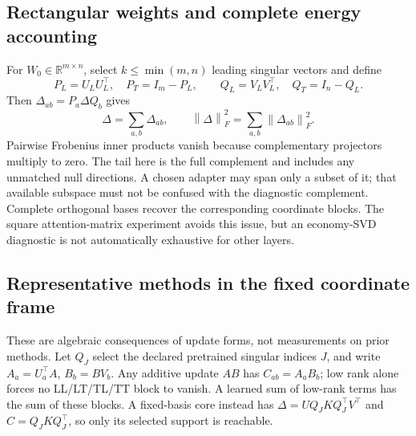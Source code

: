 \documentclass{article}
\newcommand{\fro}[1]{\left\|#1\right\|_F}
\begin{document}
\subsection{Rectangular weights and complete energy accounting}
\label{app:rectangular}
For $W_0\in\mathbb R^{m\times n}$, select $k\le\min(m,n)$ leading singular vectors and define
\begin{equation}
P_L=U_LU_L^\top,\quad P_T=I_m-P_L,\qquad
Q_L=V_LV_L^\top,\quad Q_T=I_n-Q_L.
\end{equation}
Then $\Delta_{ab}=P_a\Delta Q_b$ gives
\begin{equation}
\Delta=\sum_{a,b}\Delta_{ab},\qquad
\fro{\Delta}^2=\sum_{a,b}\fro{\Delta_{ab}}^2.
\end{equation}
Pairwise Frobenius inner products vanish because complementary projectors multiply to zero. The tail here is the full complement and includes any unmatched null directions. A chosen adapter may span only a subset of it; that available subspace must not be confused with the diagnostic complement. Complete orthogonal bases recover the corresponding coordinate blocks. The square attention-matrix experiment avoids this issue, but an economy-SVD diagnostic is not automatically exhaustive for other layers.

\subsection{Representative methods in the fixed coordinate frame}
\label{app:methodcoordinates}
These are algebraic consequences of update forms, not measurements on prior methods. Let $Q_J$ select the declared pretrained singular indices $J$, and write $A_a=U_a^\top A$, $B_b=B V_b$. Any additive update $AB$ has $C_{ab}=A_aB_b$; low rank alone forces no LL/LT/TL/TT block to vanish. A learned sum of low-rank terms has the sum of these blocks. A fixed-basis core instead has $\Delta=UQ_JKQ_J^\top V^\top$ and $C=Q_JKQ_J^\top$, so only its selected support is reachable.
\end{document}
